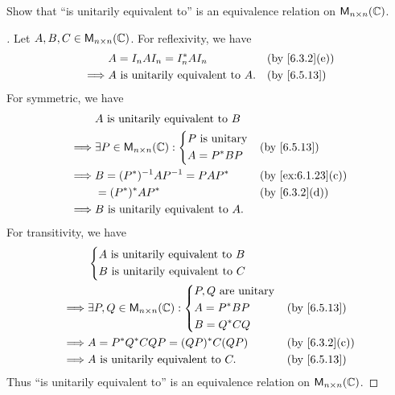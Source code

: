 \exercisesection

\begin{ex}\label{ex:6.5.18}
	Show that ``is unitarily equivalent to'' is an equivalence relation on \(\ms[n][n][\C]\).
\end{ex}

\begin{proof}[]
	Let \(A, B, C \in \ms[n][n][\C]\).
	For reflexivity, we have
	\begin{align*}
		         & A = I_n A I_n = I_n^* A I_n              &  & \by{6.3.2}[e] \\
		\implies & A \text{ is unitarily equivalent to } A. &  & \by{6.5.13}
	\end{align*}
	For symmetric, we have
	\begin{align*}
		         & A \text{ is unitarily equivalent to } B                             \\
		\implies & \exists P \in \ms[n][n][\C] : \begin{dcases}
			                                         P \text{ is unitary} \\
			                                         A = P^* B P
		                                         \end{dcases} &  & \by{6.5.13}         \\
		\implies & B = (P^*)^{-1} A P^{-1} = P A P^*            &  & \by{ex:6.1.23}[c] \\
		         & = (P^*)^* A P^*                              &  & \by{6.3.2}[d]     \\
		\implies & B \text{ is unitarily equivalent to } A.
	\end{align*}
	For transitivity, we have
	\begin{align*}
		         & \begin{dcases}
			           A \text{ is unitarily equivalent to } B \\
			           B \text{ is unitarily equivalent to } C
		           \end{dcases}                            \\
		\implies & \exists P, Q \in \ms[n][n][\C] : \begin{dcases}
			                                            P, Q \text{ are unitary} \\
			                                            A = P^* B P              \\
			                                            B = Q^* C Q
		                                            \end{dcases} &  & \by{6.5.13}     \\
		\implies & A = P^* Q^* C Q P = (QP)^* C (QP)               &  & \by{6.3.2}[c] \\
		\implies & A \text{ is unitarily equivalent to } C.        &  & \by{6.5.13}
	\end{align*}
	Thus ``is unitarily equivalent to'' is an equivalence relation on \(\ms[n][n][\C]\).
\end{proof}
